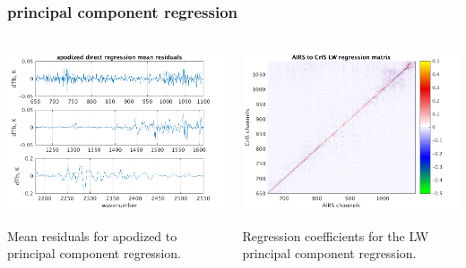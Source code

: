 \documentclass[10pt]{beamer}
\begin{document}
\begin{frame}
\frametitle{principal component regression}
\begin{columns}[t]
\begin{column}{0.5\textwidth}
  \begin{centering}
  \includegraphics[width=\textwidth]{slackfigs/ap_pc_direct_regr.png}
  \end{centering}\vspace{3mm}
  Mean residuals for apodized {\airs} to {\cris} principal component
  regression.

\end{column}
\begin{column}{0.5\textwidth}  
  \begin{centering}
  \includegraphics[width=\textwidth]{slackfigs/LW_pc_regr_mat.png}
  \end{centering}\vspace{3mm}
  Regression coefficients for the LW principal component regression.
 
\end{column}
\end{columns}
\end{frame}
\end{document}
